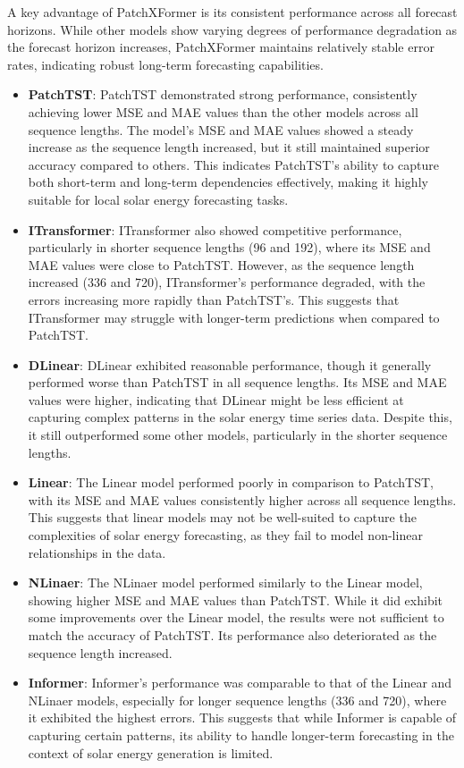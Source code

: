 \documentclass[12pt]{uomthesis}
\begin{document}
A key advantage of PatchXFormer is its consistent performance across all forecast horizons. While other models show varying degrees of performance degradation as the forecast horizon increases, PatchXFormer maintains relatively stable error rates, indicating robust long-term forecasting capabilities.

\begin{itemize}
    \item \textbf{PatchTST}: PatchTST demonstrated strong performance, consistently achieving lower MSE and MAE values than the other models across all sequence lengths. The model’s MSE and MAE values showed a steady increase as the sequence length increased, but it still maintained superior accuracy compared to others. This indicates PatchTST's ability to capture both short-term and long-term dependencies effectively, making it highly suitable for local solar energy forecasting tasks.

    \item \textbf{ITransformer}: ITransformer also showed competitive performance, particularly in shorter sequence lengths (96 and 192), where its MSE and MAE values were close to PatchTST. However, as the sequence length increased (336 and 720), ITransformer's performance degraded, with the errors increasing more rapidly than PatchTST’s. This suggests that ITransformer may struggle with longer-term predictions when compared to PatchTST.

    \item \textbf{DLinear}: DLinear exhibited reasonable performance, though it generally performed worse than PatchTST in all sequence lengths. Its MSE and MAE values were higher, indicating that DLinear might be less efficient at capturing complex patterns in the solar energy time series data. Despite this, it still outperformed some other models, particularly in the shorter sequence lengths.

    \item \textbf{Linear}: The Linear model performed poorly in comparison to PatchTST, with its MSE and MAE values consistently higher across all sequence lengths. This suggests that linear models may not be well-suited to capture the complexities of solar energy forecasting, as they fail to model non-linear relationships in the data.

    \item \textbf{NLinaer}: The NLinaer model performed similarly to the Linear model, showing higher MSE and MAE values than PatchTST. While it did exhibit some improvements over the Linear model, the results were not sufficient to match the accuracy of PatchTST. Its performance also deteriorated as the sequence length increased.

    \item \textbf{Informer}: Informer’s performance was comparable to that of the Linear and NLinaer models, especially for longer sequence lengths (336 and 720), where it exhibited the highest errors. This suggests that while Informer is capable of capturing certain patterns, its ability to handle longer-term forecasting in the context of solar energy generation is limited.
\end{itemize}
\end{document}
